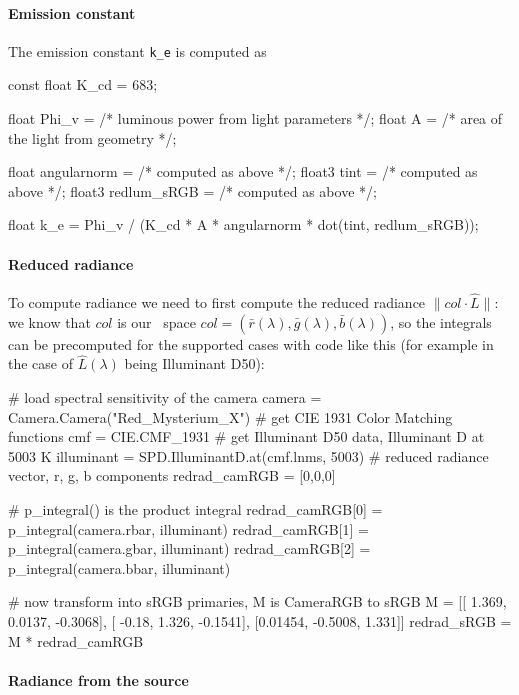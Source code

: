 \paragraph{Emission constant}

The emission constant \Verb|k_e| is computed as

\begin{c++code}
const float K_{cd} = 683;

float Phi_v = /* luminous power from light parameters */;
float A     = /* area of the light from geometry */;

float  angularnorm = /* computed as above */;
float3 tint        = /* computed as above */;
float3 redlum_sRGB = /* computed as above */;

float k_e = Phi_v / (K_{cd} * A * angularnorm * dot(tint, redlum_sRGB));
\end{c++code}


\paragraph{Reduced radiance}

To compute radiance we need to first compute the reduced radiance $\|col\cdot
\hat L\|$: we know that $col$ is our \camRGBl\ space $col = (\bar r(\lambda),
\bar g(\lambda), \bar b(\lambda))$, so the integrals can be precomputed for the
supported cases with code like this (for example in the case of $\hat
L(\lambda)$ being Illuminant D50):

\begin{pythoncode}
# load spectral sensitivity of the camera
camera = Camera.Camera("Red_Mysterium_X")
# get CIE 1931 Color Matching functions
cmf = CIE.CMF_1931
# get Illuminant D50 data, Illuminant D at 5003 K
illuminant = SPD.IlluminantD.at(cmf.lnms, 5003)
# reduced radiance vector, r, g, b components
redrad_camRGB = [0,0,0]

# p\_integral() is the product integral
redrad_camRGB[0] = p_integral(camera.rbar, illuminant)
redrad_camRGB[1] = p_integral(camera.gbar, illuminant)
redrad_camRGB[2] = p_integral(camera.bbar, illuminant)

# now transform into sRGB primaries, M is CameraRGB to sRGB
M = [[  1.369,  0.0137, -0.3068],
 [  -0.18,   1.326, -0.1541],
 [0.01454, -0.5008,   1.331]]
redrad_sRGB = M * redrad_camRGB

\end{pythoncode}

\paragraph{Radiance from the source}

